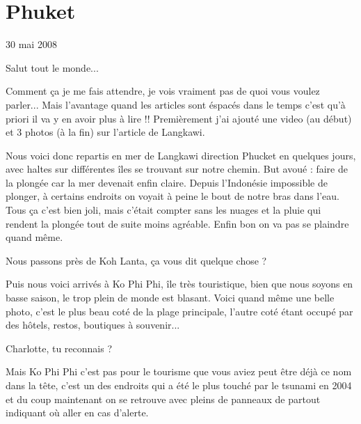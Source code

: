 \section{Phuket}

30 mai 2008

\begin{multicols}{2}

Salut tout le monde...

Comment ça je me fais attendre, je vois vraiment pas de quoi vous voulez parler... Mais l'avantage quand les articles sont éspacés dans le temps c'est qu'à priori il va y en avoir plus à lire !! Premièrement j'ai ajouté une video (au début) et 3 photos (à la fin) sur l'article de Langkawi.

Nous voici donc repartis en mer de Langkawi direction Phucket en quelques jours, avec haltes sur différentes îles se trouvant sur notre chemin. But avoué : faire de la plongée car la mer devenait enfin claire. Depuis l'Indonésie impossible de plonger, à certains endroits on voyait à peine le bout de notre bras dans l'eau. Tous ça c'est bien joli, mais c'était compter sans les nuages et la pluie qui rendent la plongée tout de suite moins agréable. Enfin bon on va pas se plaindre quand même.

Nous passons près de Koh Lanta, ça vous dit quelque chose ?


Puis nous voici arrivés à Ko Phi Phi, île très touristique, bien que nous soyons en basse saison, le trop plein de monde est blasant. Voici quand même une belle photo, c'est le plus beau coté de la plage principale, l'autre coté étant occupé par des hôtels, restos, boutiques à souvenir...


Charlotte, tu reconnais ?

Mais Ko Phi Phi c'est pas pour le tourisme que vous aviez peut être déjà ce nom dans la tête, c'est un des endroits qui a été le plus touché par le tsunami en 2004 et du coup maintenant on se retrouve avec pleins de panneaux de partout indiquant où aller en cas d'alerte.


\end{multicols}
